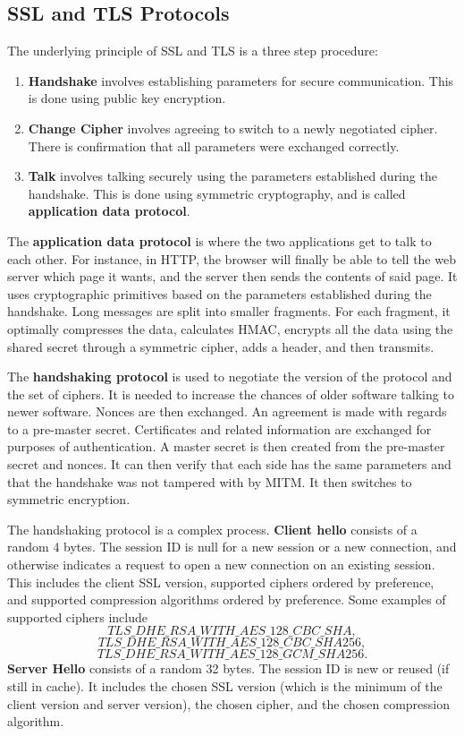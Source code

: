 \documentclass[11pt]{article}
\theoremstyle{plain} %
\theoremstyle{definition}
\theoremstyle{example}
\theoremstyle{remark}
\begin{document}
\subsection{SSL and TLS Protocols}
The underlying principle of SSL and TLS is a three step procedure:
\begin{enumerate}
	\item \textbf{Handshake} involves establishing parameters for secure communication. This is done using public key encryption. 
	\item \textbf{Change Cipher} involves agreeing to switch to a newly negotiated cipher. There is confirmation that all parameters were exchanged correctly. 
	\item \textbf{Talk} involves talking securely using the parameters established during the handshake. This is done using symmetric cryptography, and is called \textbf{application data protocol}. 
\end{enumerate}

The \textbf{application data protocol} is where the two applications get to talk to each other. For instance, in HTTP, the browser will finally be able to tell the web server which page it wants, and the server then sends the contents of said page. It uses cryptographic primitives based on the parameters established during the handshake. Long messages are split into smaller fragments. For each fragment, it optimally compresses the data, calculates HMAC, encrypts all the data using the shared secret through a symmetric cipher, adds a header, and then transmits. 

The \textbf{handshaking protocol} is used to negotiate the version of the protocol and the set of ciphers. It is needed to increase the chances of older software talking to newer software. Nonces are then exchanged. An agreement is made with regards to a pre-master secret. Certificates and related information are exchanged for purposes of authentication. A master secret is then created from the pre-master secret and nonces. It can then verify that each side has the same parameters and that the handshake was not tampered with by MITM. It then switches to symmetric encryption. 

The handshaking protocol is a complex process. \textbf{Client hello} consists of a random 4 bytes. The session ID is null for a new session or a new connection, and otherwise indicates a request to open a new connection on an existing session. This includes the client SSL version, supported ciphers ordered by preference, and supported compression algorithms ordered by preference. Some examples of supported ciphers include 
$$TLS\_DHE\_RSA\_WITH\_AES\_128\_CBC\_SHA,$$
$$TLS\_DHE\_RSA\_WITH\_AES\_128\_CBC\_SHA256,$$
$$TLS\_DHE\_RSA\_WITH\_AES\_128\_GCM\_SHA256.$$
\textbf{Server Hello} consists of a random 32 bytes. The session ID is new or reused (if still in cache). It includes the chosen SSL version (which is the minimum of the client version and server version), the chosen cipher, and the chosen compression algorithm. 
\end{document}
